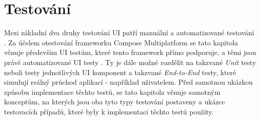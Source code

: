 \chapter{Testování} \label{testsSection}


Mezi základní dva druhy testování UI patří manuální a automatizované testování \cite{testing}. Za účelem otestování frameworku Compose Multiplatform
se tato kapitola věnuje především UI testům, které tento framework přímo podporuje, a těmi jsou právě automatizované UI testy \cite{testingUI}.
Ty je dále možné rozdělit na takzvané \textit{Unit} testy neboli testy jednotlivých UI komponent a takzvané \textit{End-to-End} testy, 
které simulují reálný průchod aplikací - například uživatelem. Před samotnou ukázkou způsobu implementace těchto testů, se tato kapitola
věnuje samotným konceptům, na kterých jsou oba tyto typy testování postaveny a ukázce testovacích případů, které byly k implementaci
těchto testů použity.







